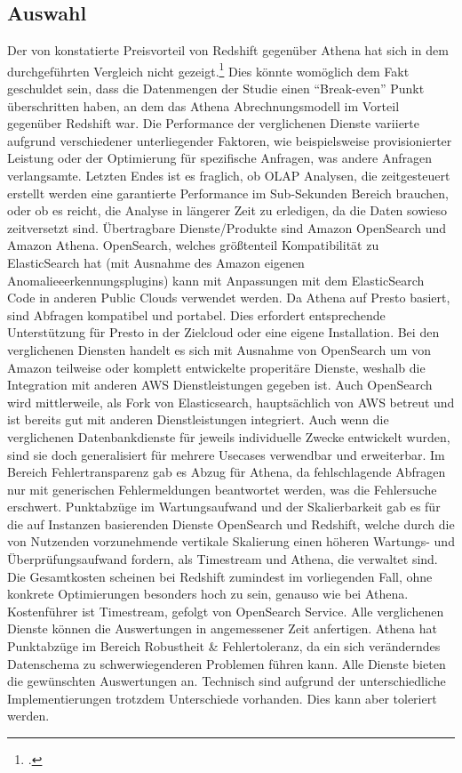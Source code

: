 \subsection{Auswahl}
Der von \citeauthor{Tan.2019} konstatierte Preisvorteil von Redshift gegenüber Athena hat sich in dem durchgeführten Vergleich nicht gezeigt.\footcite[Vgl.][2178\psq]{Tan.2019} Dies könnte womöglich dem Fakt geschuldet sein, dass die Datenmengen der Studie einen \enquote{Break-even} Punkt überschritten haben, an dem das Athena Abrechnungsmodell im Vorteil gegenüber Redshift war.
Die Performance der verglichenen Dienste variierte aufgrund verschiedener unterliegender Faktoren, wie beispielsweise provisionierter Leistung oder der Optimierung für spezifische Anfragen, was andere Anfragen verlangsamte. Letzten Endes ist es fraglich, ob \ac{OLAP} Analysen, die zeitgesteuert erstellt werden eine garantierte Performance im Sub-Sekunden Bereich brauchen, oder ob es reicht, die Analyse in längerer Zeit zu erledigen, da die Daten sowieso zeitversetzt sind.
Übertragbare Dienste/Produkte sind Amazon OpenSearch und Amazon Athena. OpenSearch, welches größtenteil Kompatibilität zu ElasticSearch hat (mit Ausnahme des Amazon eigenen Anomalieeerkennungsplugins) kann mit Anpassungen mit dem ElasticSearch Code in anderen Public Clouds verwendet werden. Da Athena auf Presto basiert, sind Abfragen kompatibel und portabel. Dies erfordert entsprechende Unterstützung für Presto in der Zielcloud oder eine eigene Installation.
Bei den verglichenen Diensten handelt es sich mit Ausnahme von OpenSearch um von Amazon teilweise oder komplett entwickelte properitäre Dienste, weshalb die Integration mit anderen \ac{AWS} Dienstleistungen gegeben ist. Auch OpenSearch wird mittlerweile, als Fork von Elasticsearch, hauptsächlich von \ac{AWS} betreut und ist bereits gut mit anderen Dienstleistungen integriert.
Auch wenn die verglichenen Datenbankdienste für jeweils individuelle Zwecke entwickelt wurden, sind sie doch generalisiert für mehrere Usecases verwendbar und erweiterbar.
Im Bereich Fehlertransparenz gab es Abzug für Athena, da fehlschlagende Abfragen nur mit generischen Fehlermeldungen beantwortet werden, was die Fehlersuche erschwert.
Punktabzüge im Wartungsaufwand und der Skalierbarkeit gab es für die auf Instanzen basierenden Dienste OpenSearch und Redshift, welche durch die von Nutzenden vorzunehmende vertikale Skalierung einen höheren Wartungs- und Überprüfungsaufwand fordern, als Timestream und Athena, die verwaltet sind.
Die Gesamtkosten scheinen bei Redshift zumindest im vorliegenden Fall, ohne konkrete Optimierungen besonders hoch zu sein, genauso wie bei Athena. Kostenführer ist Timestream, gefolgt von OpenSearch Service.
Alle verglichenen Dienste können die Auswertungen in angemessener Zeit anfertigen. 
Athena hat Punktabzüge im Bereich Robustheit \& Fehlertoleranz, da ein sich veränderndes Datenschema zu schwerwiegenderen Problemen führen kann.
Alle Dienste bieten die gewünschten Auswertungen an. Technisch sind aufgrund der unterschiedliche Implementierungen trotzdem Unterschiede vorhanden. Dies kann aber toleriert werden.




